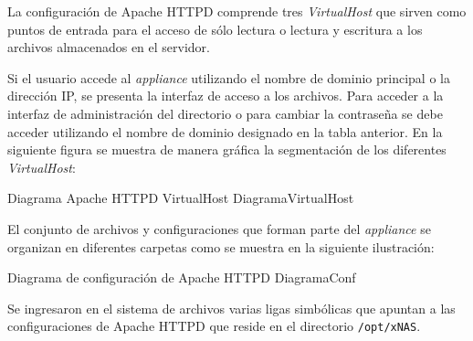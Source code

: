 La configuraci\'{o}n de Apache \textsc{HTTPD} comprende tres \emph{\gls{VirtualHost}} que sirven como puntos de entrada para el acceso de s\'{o}lo lectura o lectura y escritura a los archivos almacenados en el servidor.

{
 \begin{table}[H]
 \caption{VirtualHost configurados en Apache \textsc{HTTPD}}{}
 \label{tab:virtualhost}
 \noindent{} %
 \end{table}
}

Si el usuario accede al \textit{appliance} utilizando el nombre de dominio principal o la direcci\'{o}n IP, se presenta la interfaz de acceso a los archivos. Para acceder a la interfaz de administraci\'{o}n del directorio o para cambiar la contrase\~{n}a se debe acceder utilizando el nombre de dominio designado en la tabla anterior. En la siguiente figura se muestra de manera gr\'{a}fica la segmentaci\'{o}n de los diferentes \emph{\gls{VirtualHost}}:

\diagramblock
{Diagrama Apache \textsc{HTTPD} VirtualHost}
{DiagramaVirtualHost}
{
 {
  
 }
}

\newpage
El conjunto de archivos y configuraciones que forman parte del \textit{appliance} se organizan en diferentes carpetas como se muestra en la siguiente ilustraci\'{o}n:

\diagramblock
{Diagrama de configuraci\'{o}n de Apache \textsc{HTTPD}}
{DiagramaConf}
{
 {
  
 }
}

Se ingresaron en el sistema de archivos varias ligas simb\'{o}licas que apuntan a las configuraciones de Apache \textsc{HTTPD} que reside en el directorio \texttt{/opt/xNAS}.

